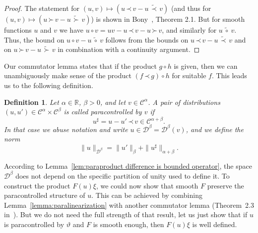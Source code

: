 \documentclass[a4paper,11pt]{article}
\newtheorem{definition}[theorem]{Definition}
\theoremstyle{remark}
\newcommand{\R}{\mathbb{R}}
\newcommand{\CC}{\ensuremath{\mathscr{C}}}
\newcommand{\CD}{\ensuremath{\mathscr{D}}}
\newcommand{\lpara}{\,\mathord{\prec}\,}
\newcommand{\rpara}{\,\mathord{\succ}\,}
\newcommand{\reso}{\,\mathord{\circ}\,}
\begin{document}
\begin{proof}
   The statement for $(u,v) \mapsto (u \lpara v - u \ \widetilde{\lpara} \ v)$ (and thus for $(u,v) \mapsto (u \rpara v - u \ \widetilde{\rpara} \ v)$) is shown in Bony~\cite{Bony1981}, Theorem 2.1. But for smooth functions $u$ and $v$ we have $u \reso v = uv - u \lpara v - u \rpara v$, and similarly for $u \ \widetilde{\reso} \ v$. Thus, the bound on $u \reso v - u \ \widetilde{\reso} \ v$ follows from the bounds on $u \lpara v - u \ \widetilde{\lpara} \ v$ and on $u \rpara v - u \ \widetilde{\rpara} \ v$ in combination with a continuity argument.
\end{proof}

Our commutator lemma states that if the product $g \reso h$ is given, then we can unambiguously make sense of the product $(f\lpara g) \reso h$ for suitable $f$. This leads us to the following definition.

\begin{definition}\label{def:paracontrolled}
   Let $\alpha \in \R$, $\beta>0$, and let $v \in \CC^\alpha$. A pair of distributions $(u,u') \in \CC^\alpha \times \CC^{\beta}$ is called \emph{paracontrolled} by $v$ if
   \[
      u^\sharp = u - u'\lpara v \in \CC^{\alpha+\beta}.
   \]
   In that case we abuse notation and write $u \in \CD^\beta = \CD^\beta(v)$, and we define the norm
   \[
     \| u \|_{\CD^\beta} = \|u'\|_\beta + \|u^\sharp\|_{\alpha+\beta}. 
   \]
\end{definition}

According to Lemma~\ref{lem:paraproduct difference is bounded operator}, the space $\CD^\beta$ does not depend on the specific partition of unity used to define it. To construct the product $F(u)\xi$, we could now show that smooth $F$ preserve the paracontrolled structure of $u$. This can be achieved by combining Lemma~\ref{lemma:paralinearization} with another commutator lemma (Theorem~2.3 in~\cite{Bony1981}). But we do not need the full strength of that result, let us just show that if $u$ is paracontrolled by $\vartheta$ and $F$ is smooth enough, then $F(u) \xi$ is well defined.
\end{document}
